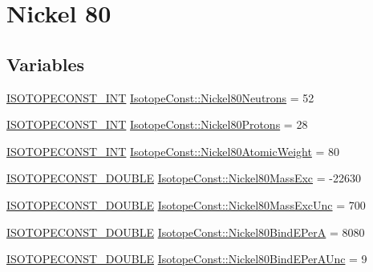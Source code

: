 \hypertarget{group___isotope_const-_nickel-_ni80}{}\section{Nickel 80}
\label{group___isotope_const-_nickel-_ni80}
\subsection*{Variables}
\begin{DoxyCompactItemize}
\item 
\mbox{\hyperlink{group___isotope_const-_macros_ga5f18360b3e99483a35c32d789e62621c}{I\+S\+O\+T\+O\+P\+E\+C\+O\+N\+S\+T\+\_\+\+I\+NT}} \mbox{\hyperlink{group___isotope_const-_nickel-_ni80_gac42074da1a58e2c8b3f4f17e6c6af093}{Isotope\+Const\+::\+Nickel80\+Neutrons}} = 52
\item 
\mbox{\hyperlink{group___isotope_const-_macros_ga5f18360b3e99483a35c32d789e62621c}{I\+S\+O\+T\+O\+P\+E\+C\+O\+N\+S\+T\+\_\+\+I\+NT}} \mbox{\hyperlink{group___isotope_const-_nickel-_ni80_gac7f81bcd2bf30596c727e4871a39e8c1}{Isotope\+Const\+::\+Nickel80\+Protons}} = 28
\item 
\mbox{\hyperlink{group___isotope_const-_macros_ga5f18360b3e99483a35c32d789e62621c}{I\+S\+O\+T\+O\+P\+E\+C\+O\+N\+S\+T\+\_\+\+I\+NT}} \mbox{\hyperlink{group___isotope_const-_nickel-_ni80_gac713735c61d7e7c1aedee250853fd266}{Isotope\+Const\+::\+Nickel80\+Atomic\+Weight}} = 80
\item 
\mbox{\hyperlink{group___isotope_const-_macros_ga8f45a7272ce02c0b4c65c44636ed719a}{I\+S\+O\+T\+O\+P\+E\+C\+O\+N\+S\+T\+\_\+\+D\+O\+U\+B\+LE}} \mbox{\hyperlink{group___isotope_const-_nickel-_ni80_ga237b5a8402f1e58a25957220ed780149}{Isotope\+Const\+::\+Nickel80\+Mass\+Exc}} = -\/22630
\item 
\mbox{\hyperlink{group___isotope_const-_macros_ga8f45a7272ce02c0b4c65c44636ed719a}{I\+S\+O\+T\+O\+P\+E\+C\+O\+N\+S\+T\+\_\+\+D\+O\+U\+B\+LE}} \mbox{\hyperlink{group___isotope_const-_nickel-_ni80_gae211c7863985beda4da756802c515342}{Isotope\+Const\+::\+Nickel80\+Mass\+Exc\+Unc}} = 700
\item 
\mbox{\hyperlink{group___isotope_const-_macros_ga8f45a7272ce02c0b4c65c44636ed719a}{I\+S\+O\+T\+O\+P\+E\+C\+O\+N\+S\+T\+\_\+\+D\+O\+U\+B\+LE}} \mbox{\hyperlink{group___isotope_const-_nickel-_ni80_gabc1ce44f1f77f87c74a6e03b3d33db38}{Isotope\+Const\+::\+Nickel80\+Bind\+E\+PerA}} = 8080
\item 
\mbox{\hyperlink{group___isotope_const-_macros_ga8f45a7272ce02c0b4c65c44636ed719a}{I\+S\+O\+T\+O\+P\+E\+C\+O\+N\+S\+T\+\_\+\+D\+O\+U\+B\+LE}} \mbox{\hyperlink{group___isotope_const-_nickel-_ni80_ga874f3e86ee490937501f45aa070da770}{Isotope\+Const\+::\+Nickel80\+Bind\+E\+Per\+A\+Unc}} = 9

\end{DoxyCompactItemize}
